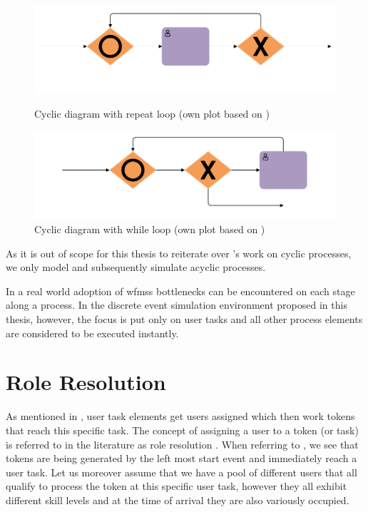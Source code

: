 \begin{figure}[!ht]
	\centering
	\begin{minipage}[b]{0.45\textwidth}
		\includegraphics[width=\textwidth]{img/repeat_loops}
		\caption{Cyclic diagram with repeat loop (own plot based on \citet[p. 12]{Soerensen2005})}
		\label{fig:repeat_loops}
	\end{minipage}
	\hfill
	\begin{minipage}[b]{0.45\textwidth}
		\includegraphics[width=\textwidth]{img/while_loops}
		\caption{Cyclic diagram with while loop (own plot based on \citet[p. 12]{Soerensen2005})}
		\label{fig:while_loops}
	\end{minipage}
\end{figure}

As it is out of scope for this thesis to reiterate over \citet{Soerensen2005}'s work on cyclic processes, we only model and subsequently simulate acyclic processes.

In a real world adoption of \glspl{wfms} bottlenecks can be encountered on each stage along a process. In the discrete event simulation environment proposed in this thesis, however, the focus is put only on user tasks and all other process elements are considered to be executed instantly.

\section{Role Resolution}
\label{sec:role_resolution_theory}

As mentioned in , user task elements get users assigned which then work tokens that reach this specific task. The concept of assigning a user to a token (or task) is referred to in the literature as role resolution \citep{Zeng2005,Cheng2000}. When referring to , we see that tokens are being generated by the left most start event and immediately reach a user task. Let us moreover assume that we have a pool of different users that all qualify to process the token at this specific user task, however they all exhibit different skill levels and at the time of arrival they are also variously occupied. 


